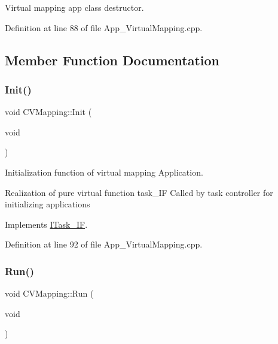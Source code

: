 Virtual mapping app class destructor. 



Definition at line 88 of file App\+\_\+\+Virtual\+Mapping.\+cpp.



\subsection{Member Function Documentation}
\mbox{\label{class_c_v_mapping_a110257122b8946bcb8f17051070e03eb}} 
\subsubsection{\texorpdfstring{Init()}{Init()}}
{\footnotesize\ttfamily void C\+V\+Mapping\+::\+Init (\begin{DoxyParamCaption}\item[{void}]{ }\end{DoxyParamCaption})\hspace{0.3cm}{\ttfamily [virtual]}}



Initialization function of virtual mapping Application. 

Realization of pure virtual function task\+\_\+\+IF Called by task controller for initializing applications 

Implements \mbox{\hyperlink{class_i_task___i_f_a28f608bdb9b19658403f7b9b7421968d}{I\+Task\+\_\+\+IF}}.



Definition at line 92 of file App\+\_\+\+Virtual\+Mapping.\+cpp.

\mbox{\label{class_c_v_mapping_a8f064fcfd01953d7072efd5de23f89ef}} 
\subsubsection{\texorpdfstring{Run()}{Run()}}
{\footnotesize\ttfamily void C\+V\+Mapping\+::\+Run (\begin{DoxyParamCaption}\item[{void}]{ }\end{DoxyParamCaption})\hspace{0.3cm}{\ttfamily [virtual]}}



